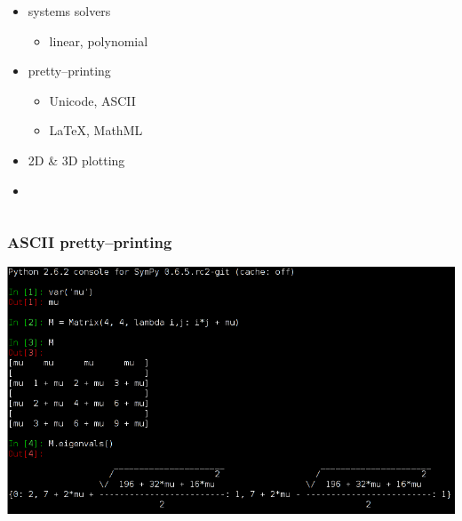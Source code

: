 \documentclass{beamer}
\begin{document}
\begin{frame}[fragile]
\begin{columns}
\begin{column}[r]{0.5\textwidth}
\begin{itemize}
                \item systems solvers
                    \begin{itemize}
                        \item linear, polynomial
                    \end{itemize}
                \item pretty--printing
                    \begin{itemize}
                        \item Unicode, ASCII
                        \item LaTeX, MathML
                    \end{itemize}
                \item 2D \& 3D plotting
                \item \structure{\ldots}
            \end{itemize}
        \end{column}
    \end{columns}
\end{frame}

\begin{frame}[fragile]
    \frametitle{ASCII pretty--printing}

    \begin{center}
        \includegraphics[scale=0.65]{images/sympy-ascii.png}
    \end{center}
\end{frame}
\end{document}
